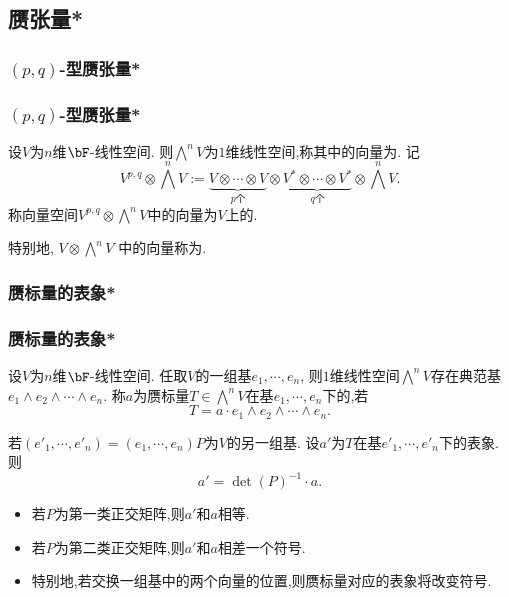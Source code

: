 \subsection{赝张量*}



\subsubsection{$(p,q)$-型赝张量*}
\begin{frame}\frametitle{$(p,q)$-型赝张量*}

设$V$为$n$维$\bF$-线性空间. 则$\bigwedge^n V$为$1$维线性空间,称其中的向量为.
\pp
记
\[V^{p,q}\otimes \bigwedge^n V:= \underbrace{V\otimes\cdots\otimes V}_{p\text{个}}\otimes\underbrace{V^*\otimes\cdots\otimes V^*}_{q\text{个}}\otimes \bigwedge^n V.\]
\pp
称向量空间$V^{p,q}\otimes \bigwedge^n V$中的向量为$V$上的.

\pp
特别地, $V\otimes \bigwedge^n V$ 中的向量称为.
\end{frame}





\subsubsection{赝标量的表象*}
\begin{frame}\frametitle{赝标量的表象*}

\begin{definition}
设$V$为$n$维$\bF$-线性空间.
\pp
任取$V$的一组基$e_1,\cdots,e_n$, 则$1$维线性空间$\bigwedge^n V$存在典范基$e_1\wedge e_2\wedge \cdots \wedge e_n$.
\pp
称$a$为赝标量$T\in \bigwedge^n V$在基$e_1,\cdots,e_n$下的,若
\[T = a \cdot e_1\wedge e_2\wedge \cdots \wedge e_n.\]
\end{definition}
\pp

\begin{proposition}
若$(e'_1,\cdots,e'_n)=(e_1,\cdots,e_n)P$为$V$的另一组基.
\pp
设$a'$为$T$在基$e'_1,\cdots,e'_n$下的表象.
\pp
则
\[a' = \det(P)^{-1}\cdot a.\]
\end{proposition}
\pp

\begin{corollary}
\begin{itemize}
\item 若$P$为第一类正交矩阵,则$a'$和$a$相等.
\pp
\item 若$P$为第二类正交矩阵,则$a'$和$a$相差一个符号.
\pp
\item 特别地,若交换一组基中的两个向量的位置,则赝标量对应的表象将改变符号.
\end{itemize}
\end{corollary}

\end{frame}


